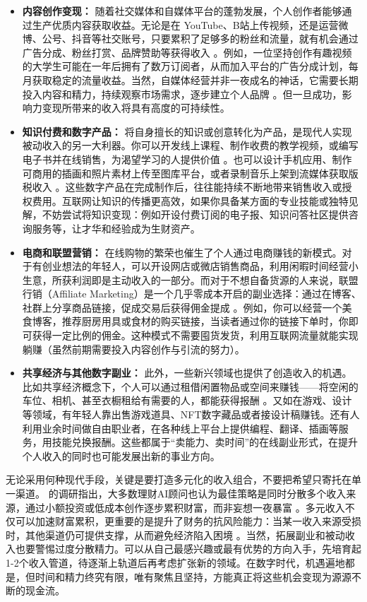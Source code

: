 \documentclass[
  12pt]{article}
\providecommand{\tightlist}{%
  \setlength{\itemsep}{0pt}\setlength{\parskip}{0pt}}
\begin{document}
\begin{itemize}
\tightlist
\item
  \textbf{内容创作变现：}
  随着社交媒体和自媒体平台的蓬勃发展，个人创作者能够通过生产优质内容获取收益。无论是在
  YouTube、B站上传视频，还是运营微博、公号、抖音等社交账号，只要累积了足够多的粉丝和流量，就有机会通过广告分成、粉丝打赏、品牌赞助等获得收入
  \cite{ref1}。例如，一位坚持创作有趣视频的大学生可能在一年后拥有了数万订阅者，从而加入平台的广告分成计划，每月获取稳定的流量收益。当然，自媒体经营并非一夜成名的神话，它需要长期投入内容和精力，持续观察市场需求，逐步建立个人品牌
  \cite{ref1}。但一旦成功，影响力变现所带来的收入将具有高度的可持续性。
\item
  \textbf{知识付费和数字产品：}
  将自身擅长的知识或创意转化为产品，是现代人实现被动收入的另一大利器。你可以开发线上课程、制作收费的教学视频，或编写电子书并在线销售，为渴望学习的人提供价值
  \cite{ref1}。也可以设计手机应用、制作可商用的插画和照片素材上传至图库平台，或者录制音乐上架到流媒体获取版税收入
  \cite{ref1}。这些数字产品在完成制作后，往往能持续不断地带来销售收入或授权费用。互联网让知识的传播更高效，如果你具备某方面的专业技能或独特见解，不妨尝试将知识变现：例如开设付费订阅的电子报、知识问答社区提供咨询服务等，让才华和经验成为生财资产。
\item
  \textbf{电商和联盟营销：}
  在线购物的繁荣也催生了个人通过电商赚钱的新模式。对于有创业想法的年轻人，可以开设网店或微店销售商品，利用闲暇时间经营小生意，所获利润即是主动收入的一部分。而对于不想自备货源的人来说，联盟行销（Affiliate
  Marketing）是一个几乎零成本开启的副业选择：通过在博客、社群上分享商品链接，促成交易后获得佣金提成
  \cite{ref6}。例如，你可以经营一个美食博客，推荐厨房用具或食材的购买链接，当读者通过你的链接下单时，你即可获得一定比例的佣金。这种模式不需要囤货发货，利用互联网流量就能实现躺赚（虽然前期需要投入内容创作与引流的努力）。
\item
  \textbf{共享经济与其他数字副业：}
  此外，一些新兴领域也提供了创造收入的机遇。比如共享经济概念下，个人可以通过租借闲置物品或空间来赚钱------将空闲的车位、相机、甚至衣橱租给有需要的人，都能获得报酬
  \cite{ref1}。又如在游戏、设计等领域，有年轻人靠出售游戏道具、NFT数字藏品或者接设计稿赚钱。还有人利用业余时间做自由职业者，在各种线上平台上提供编程、翻译、插画等服务，用技能兑换报酬。这些都属于``卖能力、卖时间''的在线副业形式，在提升个人收入的同时也可能发展出新的事业方向。
\end{itemize}

无论采用何种现代手段，关键是要打造多元化的收入组合，不要把希望只寄托在单一渠道。\cite{ref5}
的调研指出，大多数理财AI顾问也认为最佳策略是同时分散多个收入来源，通过小额投资或低成本创作逐步累积财富，而非妄想一夜暴富
\cite{ref5}。多元收入不仅可以加速财富累积，更重要的是提升了财务的抗风险能力：当某一收入来源受损时，其他渠道仍可提供支撑，从而避免经济陷入困境
\cite{ref6}。当然，拓展副业和被动收入也要警惕过度分散精力。可以从自己最感兴趣或最有优势的方向入手，先培育起1-2个收入管道，待逐渐上轨道后再考虑扩张新的领域。在数字时代，机遇遍地都是，但时间和精力终究有限，唯有聚焦且坚持，方能真正将这些机会变现为源源不断的现金流。
\end{document}
